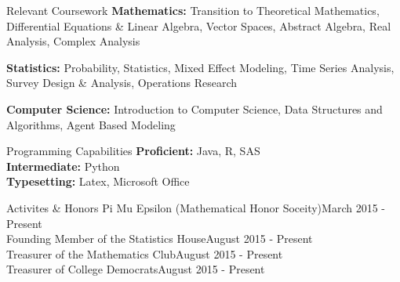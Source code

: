 \documentclass{resume} %
\begin{document}
\begin{rSection}{Relevant Coursework}
\textbf{Mathematics:} Transition to Theoretical Mathematics, Differential Equations \& Linear Algebra, Vector Spaces, Abstract Algebra, Real Analysis, Complex Analysis



\item \textbf{Statistics:} Probability, Statistics, Mixed Effect Modeling, Time Series Analysis, Survey Design \& Analysis, Operations Research


\item \textbf{Computer Science:} Introduction to Computer Science, Data Structures and Algorithms, Agent Based Modeling

\end{rSection}
\begin{rSection}{Programming Capabilities}
\textbf{Proficient:} Java, R, SAS\\
\textbf{Intermediate:} Python\\
\textbf{Typesetting:} Latex, Microsoft Office

\end{rSection}



\begin{rSection}{Activites \& Honors}
Pi Mu Epsilon (Mathematical Honor Soceity)\hfill March 2015 - Present\\
Founding Member of the Statistics House\hfill August 2015 - Present \\
Treasurer of the Mathematics Club\hfill August 2015 - Present \\
Treasurer of College Democrats\hfill August 2015 - Present
\end{rSection}
\end{document}
